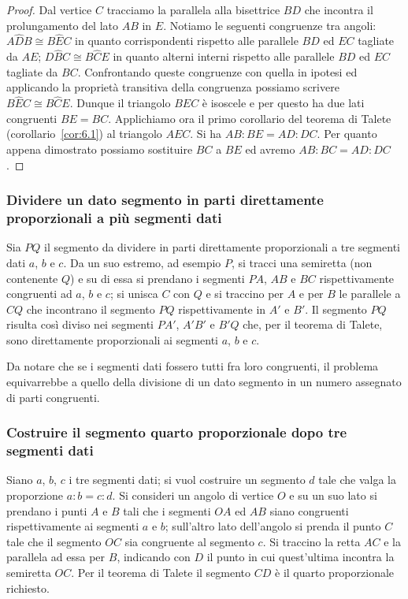 \begin{proof}
Dal vertice $C$ tracciamo la parallela alla bisettrice $BD$ che incontra il prolungamento del lato $AB$ in $E$. Notiamo le seguenti congruenze tra angoli: $A\widehat{D}B\cong B\widehat{E}C$ in quanto corrispondenti rispetto alle parallele $BD$ ed $EC$ tagliate da $AE$; $D\widehat{B}C\cong B\widehat{C}E$ in quanto alterni interni rispetto alle parallele $BD$ ed $EC$ tagliate da $BC$.
Confrontando queste congruenze con quella in ipotesi ed applicando la proprietà transitiva della congruenza possiamo scrivere $B\widehat{E}C\cong B\widehat{C}E$. Dunque il triangolo $BEC$ è isoscele e per questo ha due lati congruenti $BE = BC$.
Applichiamo ora il primo corollario del teorema di Talete (corollario~\ref{cor:6.1}) al triangolo $AEC$. Si ha $AB : BE = AD : DC$. 
Per quanto appena dimostrato possiamo sostituire $BC$ a $BE$ ed avremo $AB : BC = AD : DC$.
\end{proof}

\subsubsection{Dividere un dato segmento in parti direttamente proporzionali a più segmenti dati}

Sia $PQ$ il segmento da dividere in parti direttamente proporzionali a tre segmenti dati $a$, $b$ e $c$.
Da un suo estremo, ad esempio $P$, si tracci una semiretta (non contenente $Q$) e su di essa si prendano i segmenti $PA$, $AB$ e $BC$ rispettivamente congruenti ad $a$, $b$ e $c$; si unisca $C$ con $Q$ e si traccino per $A$ e per $B$ le parallele a $CQ$ che incontrano il segmento $PQ$ rispettivamente in $A'$ e $B'$. Il segmento $PQ$ risulta così diviso nei segmenti $PA'$, $A'B'$ e $B'Q$ che, per il teorema di Talete, sono direttamente proporzionali ai segmenti $a$, $b$ e $c$.

Da notare che se i segmenti dati fossero tutti fra loro congruenti, il problema equivarrebbe a quello della divisione di un dato segmento in un numero assegnato di parti congruenti.

\subsubsection{Costruire il segmento quarto proporzionale dopo tre segmenti dati}

Siano $a$, $b$, $c$ i tre segmenti dati; si vuol costruire un segmento $d$ tale che valga la proporzione $a:b=c:d$.
Si consideri un angolo di vertice $O$ e su un suo lato si prendano i punti $A$ e $B$ tali che i segmenti $OA$ ed $AB$ siano congruenti rispettivamente ai segmenti $a$ e $b$; sull'altro lato dell'angolo si prenda il punto $C$ tale che il segmento $OC$ sia congruente al segmento $c$. Si traccino la retta $AC$ e la parallela ad essa per $B$, indicando con $D$ il punto in cui quest'ultima incontra la semiretta $OC$. Per il teorema di Talete il segmento $CD$ è il quarto proporzionale richiesto. 

